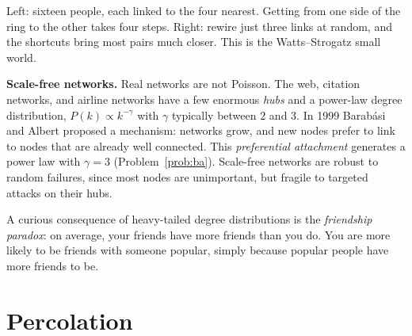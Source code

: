 \begin{center}
\begin{minipage}{\linewidth}

{\small Left: sixteen people, each linked to the four nearest. Getting from one side of the ring to the other takes four steps. Right: rewire just three links at random, and the shortcuts bring most pairs much closer. This is the Watts--Strogatz small world.}
\end{minipage}
\end{center}

\textbf{Scale-free networks.} Real networks are not Poisson. The web, citation networks, and airline networks have a few enormous \emph{hubs} and a power-law degree distribution, $P(k)\propto k^{-\gamma}$ with $\gamma$ typically between $2$ and $3$. In 1999 Barab\'asi and Albert proposed a mechanism: networks grow, and new nodes prefer to link to nodes that are already well connected. This \emph{preferential attachment} generates a power law with $\gamma = 3$ (Problem~\ref{prob:ba}). Scale-free networks are robust to random failures, since most nodes are unimportant, but fragile to targeted attacks on their hubs.

A curious consequence of heavy-tailed degree distributions is the \emph{friendship paradox}: on average, your friends have more friends than you do. You are more likely to be friends with someone popular, simply because popular people have more friends to be.

\section{Percolation}


